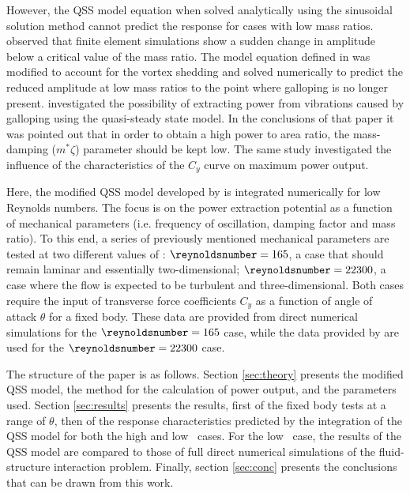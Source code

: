 However, the QSS model equation when solved analytically using the sinusoidal solution method cannot predict the response for cases with low mass ratios. \citet{Joly2012} observed that finite element simulations show a sudden change in amplitude below a critical value of the mass ratio. The model equation defined in \citet{Parkinson1964} was modified to account for the vortex shedding and solved numerically to predict the reduced amplitude at low mass ratios to the point where galloping is no longer present. \citet{Barrero-Gil2010a} investigated the possibility of extracting power from vibrations caused by galloping using the quasi-steady state model. In the conclusions of that paper it was pointed out that in order to obtain a high power to area ratio, the mass-damping ($m^*\zeta$) parameter should be kept low. The same study investigated the influence of the characteristics of the $C_y$ curve on maximum power output.

Here, the modified QSS model developed by \citet{Joly2012} is integrated numerically for low Reynolds numbers. The focus is on the power extraction potential as a function of mechanical parameters (i.e. frequency of oscillation, damping factor and mass ratio). To this end, a series of previously mentioned mechanical parameters are tested at two different values of \reynoldsnumber: $\reynoldsnumber = 165$, a case that should remain laminar and essentially two-dimensional; $\reynoldsnumber = 22300$, a case where the flow is expected to be turbulent and three-dimensional. Both cases require the input of transverse force coefficients $C_y$ as a function of angle of attack $\theta$ for a fixed body. These data are provided from direct numerical simulations for the $\reynoldsnumber = 165$ case, while the data provided by \citet{Parkinson1964} are used for the $\reynoldsnumber = 22300$ case.

The structure of the paper is as follows. Section \ref{sec:theory} presents the modified QSS model, the method for the calculation of power output, and the parameters used. Section \ref{sec:results} presents the results, first of the fixed body tests at a range of $\theta$, then of the response characteristics predicted by the integration of the QSS model for both the high and low \reynoldsnumber\ cases. For the low \reynoldsnumber\ case, the results of the QSS model are compared to those of full direct numerical simulations of the fluid-structure interaction problem. Finally, section \ref{sec:conc} presents the conclusions that can be drawn from this work.
